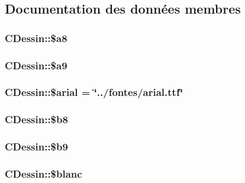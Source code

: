 \subsection{Documentation des donn\'{e}es membres}
\hypertarget{classCDessin_o0}{
\subsubsection[\$a8]{\setlength{\rightskip}{0pt plus 5cm}CDessin::\$a8}}
\label{classCDessin_o0}


\hypertarget{classCDessin_o1}{
\subsubsection[\$a9]{\setlength{\rightskip}{0pt plus 5cm}CDessin::\$a9}}
\label{classCDessin_o1}


\hypertarget{classCDessin_o20}{
\subsubsection[\$arial]{\setlength{\rightskip}{0pt plus 5cm}CDessin::\$arial = \char`\"{}../fontes/arial.ttf\char`\"{}}}
\label{classCDessin_o20}


\hypertarget{classCDessin_o2}{
\subsubsection[\$b8]{\setlength{\rightskip}{0pt plus 5cm}CDessin::\$b8}}
\label{classCDessin_o2}


\hypertarget{classCDessin_o3}{
\subsubsection[\$b9]{\setlength{\rightskip}{0pt plus 5cm}CDessin::\$b9}}
\label{classCDessin_o3}


\hypertarget{classCDessin_o15}{
\subsubsection[\$blanc]{\setlength{\rightskip}{0pt plus 5cm}CDessin::\$blanc}}
\label{classCDessin_o15}


